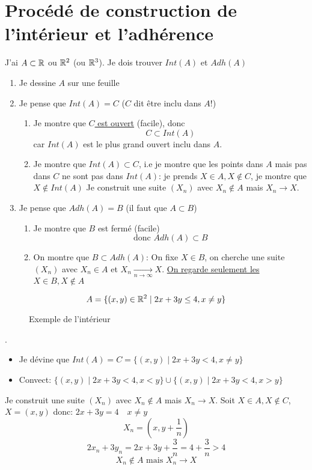 \section{Procédé de construction de l'intérieur et l'adhérence}
J'ai $A \subset \mathbb{R}$ ou $\mathbb{R}^2$ (ou $\mathbb{R}^3$). Je dois trouver $Int(A)$ et  $Adh(A)$
 \begin{enumerate}
    \item Je dessine $A$ sur une feuille
    \item Je pense que  $Int(A) = C$ ($C$ dit être inclu dans  $A$!)
         \begin{enumerate}
             \item Je montre que \underline{$C$ est ouvert} (facile), donc
                 \[
                 C \subset Int(A)
                 \] 
                 car $Int(A)$ est le plus grand ouvert inclu dans  $A$.
            \item Je montre que $Int(A) \subset C$, i.e je montre que les points dans $A$ mais pas dans  $C$ ne sont pas dans  $Int(A)$: je prends $X \in A, X \not\in C$, je montre que $X \not\in Int(A)$
                Je construit une suite $(X_n)$ avec  $X_n \not\in A$ mais  $X_n \to X$.
         \end{enumerate}
    \item Je pense que $Adh(A) = B$ (il faut que $A \subset B$)
        \begin{enumerate}
            \item Je montre que $B$ est fermé (facile)
                \[
                \text{donc } Adh(A) \subset B
                \] 
            \item  On montre que $B \subset Adh(A)$: On fixe $X \in B$, on cherche une suite  $(X_n)$ avec  $X_n \in A$ et  $X_n \xrightarrow[n \to \infty]{} X$. 
                \underline{On regarde seulement les} $X \in B, X \not\in A$
        \end{enumerate}
\end{enumerate}
\begin{eg}
   \[
       A = \{(x, y) \in \mathbb{R}^2 \mid 2x + 3y \le 4, x \neq y\}
   \]  
\begin{figure}[H]
    \centering
    \caption{Exemple de l'intérieur}
    \label{fig:example-interieur}
\end{figure}
.
\begin{itemize}
    \item 
        Je dévine que $Int(A) = C = \{(x, y) \mid 2x + 3y < 4, x \neq y\}$
    \item
        Convect: $\{(x, y) \mid 2x + 3y < 4, x < y\} \cup \{(x, y) \mid 2x + 3y < 4, x > y\}$
\end{itemize}
Je construit une suite $(X_n)$ avec  $X_n \not\in A$ mais $X_n \to X$. Soit $X \in A, X \not\in C$, $X = (x, y)$ donc:  $2x + 3y = 4 \quad x \neq y$
\[
X_n = (x, y + \frac{1}{n})
\] 
\[
2x_n + 3y_n = 2x + 3y + \frac{3}{n} = 4 + \frac{3}{n} > 4
\] 
\[
X_n \not\in A \text{ mais } X_n \to X
\] 
\end{eg}
